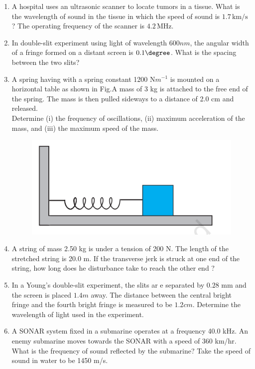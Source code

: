 \begin{enumerate}[label=\thesection.\arabic*,ref=\thesection.\theenumi]
\item
A hospital uses an ultrasonic scanner to locate tumors in a tissue. What is the wavelength of sound in the tissue in which the speed of sound is $1.7 \, \text{km/s}$? The operating frequency of the scanner is $4.2 \, \text{MHz}$.
\solution
\pagebreak

\item In double-slit experiment using light of wavelength $600 nm$, the
angular width of a fringe formed on a distant screen is $0.1\degree$. What is
the spacing between the two slits?\\
\solution
\pagebreak

\item A spring having with a spring constant 1200 N$m^{-1}$ is mounted on a horizontal
table as shown in Fig.A mass of 3 kg is attached to the free end of the
spring. The mass is then pulled sideways to a distance of 2.0 cm and released.\\
Determine (i) the frequency of oscillations, (ii) maximum acceleration of the mass,
and (iii) the maximum speed of the mass.
\begin{figure}[h!]
    \centering
    \includegraphics[width=0.5\linewidth]{ncert-physics/11/14/9/figs/analog.png}
    \caption{ }

\end{figure}
\solution
\pagebreak


\item A string of mass 2.50 kg is under a tension of 200 N. The length of the stretched string is 20.0 m. If the transverse jerk is struck at one end of the string, how long does he disturbance take to reach the other end ? 
\solution
\pagebreak

\item In a Young's double-slit experiment, the slits ar e separated by $0.28$ mm and the screen is placed $1.4 m$ away. The distance between the central bright fringe and the fourth bright fringe is measured to be $1.2 cm$. Determine the wavelength of light used in the experiment.\\
\solution
\pagebreak

\item A SONAR system fixed in a submarine operates at a frequency 40.0 kHz. An enemy submarine moves towards the SONAR with a speed of 360 km/hr. What is the frequency of sound reflected by the submarine? Take the speed of sound in water to be 1450 m/s.\\
\solution
\pagebreak


\end{enumerate}
